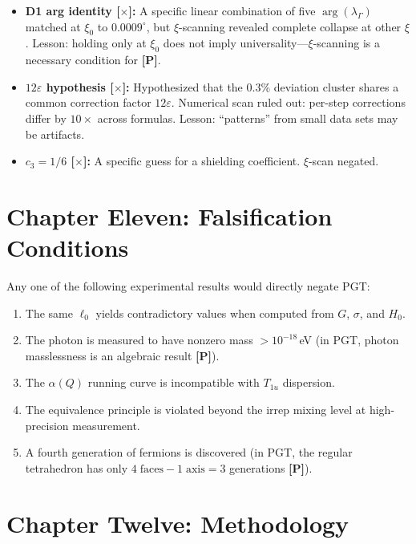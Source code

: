 \documentclass[11pt,a4paper]{article}
\newcommand{\gradeP}{\textbf{[P]}}
\newcommand{\gradeX}{\textbf{[$\times$]}}
\begin{document}
\begin{itemize}[nosep]
\item \textbf{D1 arg identity \gradeX:} A specific linear combination of five $\arg(\lambda_\Gamma)$ matched at $\xi_0$ to $0.0009^\circ$, but $\xi$-scanning revealed complete collapse at other $\xi$. Lesson: holding only at $\xi_0$ does not imply universality---$\xi$-scanning is a necessary condition for \gradeP.

\item \textbf{$12\varepsilon$ hypothesis \gradeX:} Hypothesized that the 0.3\% deviation cluster shares a common correction factor $12\varepsilon$. Numerical scan ruled out: per-step corrections differ by $10\times$ across formulas. Lesson: ``patterns'' from small data sets may be artifacts.

\item \textbf{$c_3=1/6$ \gradeX:} A specific guess for a shielding coefficient. $\xi$-scan negated.
\end{itemize}

\section{Chapter Eleven: Falsification Conditions}\label{sec:ch11}

Any one of the following experimental results would directly negate PGT:

\begin{enumerate}[nosep]
\item The same $\ell_0$ yields contradictory values when computed from $G$, $\sigma$, and $H_0$.
\item The photon is measured to have nonzero mass $>10^{-18}$\,eV (in PGT, photon masslessness is an algebraic result \gradeP).
\item The $\alpha(Q)$ running curve is incompatible with $T_{1u}$ dispersion.
\item The equivalence principle is violated beyond the irrep mixing level at high-precision measurement.
\item A fourth generation of fermions is discovered (in PGT, the regular tetrahedron has only $4\;\text{faces}-1\;\text{axis}=3$ generations \gradeP).
\end{enumerate}

\section{Chapter Twelve: Methodology}\label{sec:ch12}
\end{document}
